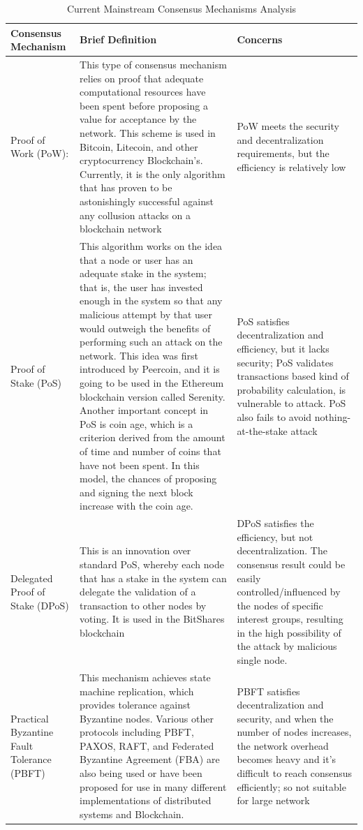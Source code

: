 \documentclass[fleqn,10pt]{SelfArx} %
\begin{document}
\begin{table}[hbt]
\caption{Current Mainstream Consensus Mechanisms Analysis}
\centering
\begin{tabular}{p{3cm}p{9cm}p{4cm}}
\toprule
Consensus Mechanism
 & Brief Definition & Concerns \\
\midrule
Proof of Work (PoW): & 
This type of consensus mechanism relies on proof that adequate computational resources have been spent before proposing a value for acceptance by the network. This scheme is used in Bitcoin, Litecoin, and other cryptocurrency Blockchain’s. Currently, it is the only algorithm that has proven to be astonishingly successful against any collusion attacks on a blockchain network
 & 
PoW meets the security and decentralization requirements, but the efficiency is relatively low
\\
\midrule
Proof of Stake (PoS)
 & 
This algorithm works on the idea that a node or user has an adequate stake in the system; that is, the user has invested enough in the system so that any malicious attempt by that user would outweigh the benefits of performing such an attack on the network. This idea was first introduced by Peercoin, and it is going to be used in the Ethereum blockchain version called Serenity. Another important concept in PoS is coin age, which is a criterion derived from the amount of time and number of coins that have not been spent. In this model, the chances of proposing and signing the next block increase with the coin age.
 & 
PoS satisfies decentralization and efficiency, but it lacks security; PoS validates transactions based kind of probability calculation, is vulnerable to attack. 
PoS also fails to avoid nothing-at-the-stake attack
\\
\midrule
Delegated Proof of Stake (DPoS)
 & 
This is an innovation over standard PoS, whereby each node that has a stake in the system can delegate the validation of a transaction to other nodes by voting. It is used in the BitShares blockchain
 & 
DPoS satisfies the efficiency, but not decentralization. The consensus result could be easily controlled/influenced by the nodes of specific interest groups, resulting in the high possibility of the attack by malicious single node.
\\
\midrule
Practical Byzantine Fault Tolerance (PBFT)
 & 
This mechanism achieves state machine replication, which provides tolerance against Byzantine nodes. Various other protocols including PBFT, PAXOS, RAFT, and Federated Byzantine Agreement (FBA) are also being used or have been proposed for use in many different implementations of distributed systems and Blockchain.
 & 
PBFT satisfies decentralization and security, and when the number of nodes increases, the network overhead becomes heavy and it’s difficult to reach consensus efficiently; so not suitable for large network
\\
\bottomrule
\end{tabular}
\label{tab:label}
\end{table}
\end{document}
